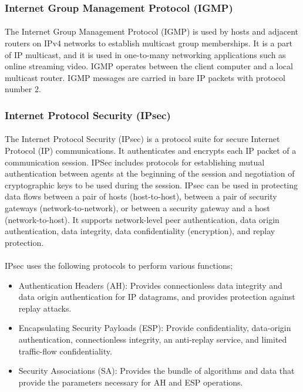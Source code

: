 \documentclass[12pt,a4paper]{report}
\begin{document}
\subsubsection{Internet Group Management Protocol (IGMP)\cite{IGMP}}
\paragraph{}The Internet Group Management Protocol (IGMP) is used by hosts and adjacent routers on IPv4 networks to establish multicast group memberships. It is a part of IP multicast, and it is used in one-to-many networking applications such as online streaming video. IGMP operates between the client computer and a local multicast router. IGMP messages are carried in bare IP packets with protocol number 2.

\subsubsection{Internet Protocol Security (IPsec)\cite{IPsec}}
\paragraph{}The Internet Protocol Security (IPsec) is a protocol suite for secure Internet Protocol (IP) communications. It authenticates and encrypts each IP packet of a communication session. IPSec includes protocols for establishing mutual authentication between agents at the beginning of the session and negotiation of cryptographic keys to be used during the session. IPsec can be used in protecting data flows between a pair of hosts (host-to-host), between a pair of security gateways (network-to-network), or between a security gateway and a host (network-to-host). It supports network-level peer authentication, data origin authentication, data integrity, data confidentiality (encryption), and replay protection.
\paragraph{}IPsec uses the following protocols to perform various functions;
\begin{itemize}
\item Authentication Headers (AH): Provides connectionless data integrity and data origin authentication for IP datagrams, and provides protection against replay attacks.
\item Encapsulating Security Payloads (ESP): Provide confidentiality, data-origin authentication, connectionless integrity, an anti-replay service, and limited traffic-flow confidentiality.
\item Security Associations (SA): Provides the bundle of algorithms and data that provide the parameters necessary for AH and ESP operations.
\end{itemize}
\end{document}
